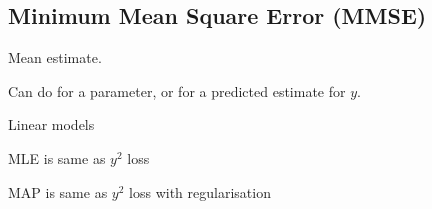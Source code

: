 
\subsection{Minimum Mean Square Error (MMSE)}

Mean estimate.

Can do for a parameter, or for a predicted estimate for \(y\).

Linear models

MLE is same as \(y^2\) loss

MAP is same as \(y^2\) loss with regularisation

